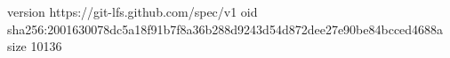 version https://git-lfs.github.com/spec/v1
oid sha256:2001630078dc5a18f91b7f8a36b288d9243d54d872dee27e90be84bcced4688a
size 10136
